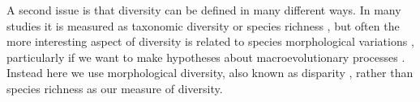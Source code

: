 \documentclass[12pt,letterpaper]{article}
\begin{document}
A second issue is that diversity can be defined in many different ways.
In many studies it is measured as taxonomic diversity or species richness \citep{Stadler12042011,meredithimpacts2011,OLeary08022013}, but often the more interesting aspect of diversity is related to species morphological variations \citep{Wesley-Hunt2005,Brusatte12092008,toljagictriassic-jurassic2013}, particularly if we want to make hypotheses about macroevolutionary processes \citep{Pearman2008149,OlsonRadiation,Losos2010,glor2010phylogenetic,benton2015}.
Instead here we use morphological diversity, also known as disparity \citep[e.g.][]{Wills1994,Erwin2007,Hughes20082013}, rather than species richness as our measure of diversity. %
\end{document}
